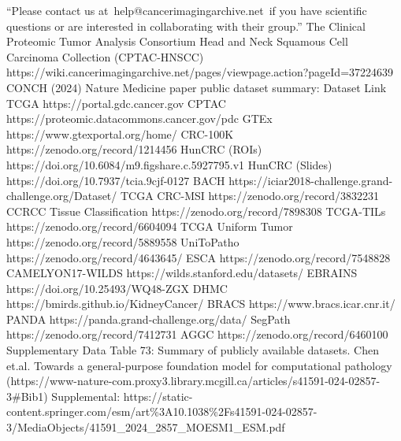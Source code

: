 \documentclass{article}%
\begin{document}
\newline%
\newline%
%
“Please contact us at~help@cancerimagingarchive.net~if you have scientific questions or are interested in collaborating with their group.”%
\newline%
\newline%
%
The Clinical Proteomic Tumor Analysis Consortium Head and Neck Squamous Cell Carcinoma Collection (CPTAC{-}HNSCC)%
\newline%
\newline%
%
https://wiki.cancerimagingarchive.net/pages/viewpage.action?pageId=37224639 %
\newline%
\newline%
%
CONCH (2024) Nature Medicine paper public dataset summary:%
\newline%
\newline%
%
Dataset Link TCGA https://portal.gdc.cancer.gov CPTAC https://proteomic.datacommons.cancer.gov/pdc GTEx https://www.gtexportal.org/home/ CRC{-}100K https://zenodo.org/record/1214456 HunCRC (ROIs) https://doi.org/10.6084/m9.figshare.c.5927795.v1 HunCRC (Slides) https://doi.org/10.7937/tcia.9cjf{-}0127 BACH https://iciar2018{-}challenge.grand{-}challenge.org/Dataset/ TCGA CRC{-}MSI https://zenodo.org/record/3832231 CCRCC Tissue Classification https://zenodo.org/record/7898308 TCGA{-}TILs https://zenodo.org/record/6604094 TCGA Uniform Tumor https://zenodo.org/record/5889558 UniToPatho https://zenodo.org/record/4643645/ ESCA https://zenodo.org/record/7548828 CAMELYON17{-}WILDS https://wilds.stanford.edu/datasets/ EBRAINS https://doi.org/10.25493/WQ48{-}ZGX DHMC https://bmirds.github.io/KidneyCancer/ BRACS https://www.bracs.icar.cnr.it/ PANDA https://panda.grand{-}challenge.org/data/ SegPath https://zenodo.org/record/7412731 AGGC https://zenodo.org/record/6460100 Supplementary Data Table 73: Summary of publicly available datasets. %
\newline%
\newline%
%
%
\newline%
\newline%
%
Chen et.al. Towards a general{-}purpose foundation model for computational pathology (https://www{-}nature{-}com.proxy3.library.mcgill.ca/articles/s41591{-}024{-}02857{-}3\#Bib1) %
\newline%
\newline%
%
Supplemental: https://static{-}content.springer.com/esm/art\%3A10.1038\%2Fs41591{-}024{-}02857{-}3/MediaObjects/41591\_2024\_2857\_MOESM1\_ESM.pdf %
\newline%
\newline%
%
%
\newline%
\newline%
%
\end{document}
